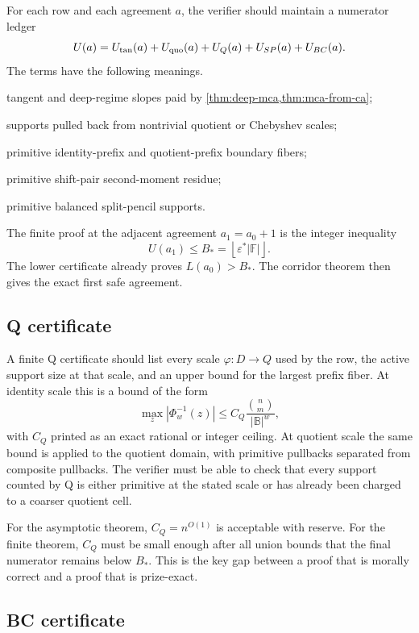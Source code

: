 \documentclass[11pt]{article}
\theoremstyle{definition}
\theoremstyle{remark}
\newcommand{\F}{\mathbb F}
\newcommand{\BB}{\mathbb B}
\newcommand{\floor}[1]{\left\lfloor #1\right\rfloor}
\newcommand{\epsstar}{\varepsilon^*}
\begin{document}
For each row and each agreement \(a\), the verifier should maintain a numerator ledger
\[
        U(a)=U_{\rm tan}(a)+U_{\rm quo}(a)+U_Q(a)+U_{SP}(a)+U_{BC}(a).
\]
The terms have the following meanings.
\begin{description}[leftmargin=2.8em,style=nextline]
\item[\(U_{\rm tan}\)] tangent and deep-regime slopes paid by \cref{thm:deep-mca,thm:mca-from-ca};
\item[\(U_{\rm quo}\)] supports pulled back from nontrivial quotient or Chebyshev scales;
\item[\(U_Q\)] primitive identity-prefix and quotient-prefix boundary fibers;
\item[\(U_{SP}\)] primitive shift-pair second-moment residue;
\item[\(U_{BC}\)] primitive balanced split-pencil supports.
\end{description}
The finite proof at the adjacent agreement \(a_1=a_0+1\) is the integer inequality
\[
        U(a_1)\le B_*=\floor{\epsstar |\F|}.
\]
The lower certificate already proves \(L(a_0)>B_*\).  The corridor theorem then gives the exact first safe agreement.

\subsection{Q certificate}\label{appsub:Q-cert}

A finite Q certificate should list every scale \(\varphi:D\to Q\) used by the row, the active support size at that scale, and an upper bound for the largest prefix fiber.  At identity scale this is a bound of the form
\[
        \max_z |\Phi_w^{-1}(z)|\le C_Q\frac{\binom nm}{|\BB|^w},
\]
with \(C_Q\) printed as an exact rational or integer ceiling.  At quotient scale the same bound is applied to the quotient domain, with primitive pullbacks separated from composite pullbacks.  The verifier must be able to check that every support counted by Q is either primitive at the stated scale or has already been charged to a coarser quotient cell.

For the asymptotic theorem, \(C_Q=n^{O(1)}\) is acceptable with reserve.  For the finite theorem, \(C_Q\) must be small enough after all union bounds that the final numerator remains below \(B_*\).  This is the key gap between a proof that is morally correct and a proof that is prize-exact.

\subsection{BC certificate}\label{appsub:BC-cert}
\end{document}
